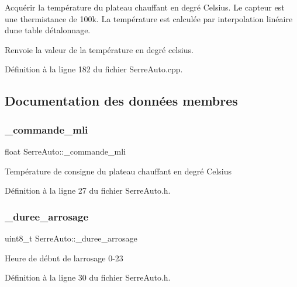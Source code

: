 Acquérir la température du plateau chauffant en degré Celsius. Le capteur est une thermistance de 100k. La température est calculée par interpolation linéaire d\textquotesingle{}une table d\textquotesingle{}étalonnage. 

\begin{DoxyReturn}{Renvoie}
la valeur de la température en degré celsius. 
\end{DoxyReturn}


Définition à la ligne 182 du fichier Serre\+Auto.\+cpp.



\subsection{Documentation des données membres}
\mbox{\label{class_serre_auto_aeb87d41d1df72cc4576a8a44d3726ed3}} 
\subsubsection{\+\_\+commande\+\_\+mli}
{\footnotesize\ttfamily float Serre\+Auto\+::\+\_\+commande\+\_\+mli\hspace{0.3cm}{\ttfamily [private]}}

Température de consigne du plateau chauffant en degré Celsius 

Définition à la ligne 27 du fichier Serre\+Auto.\+h.

\mbox{\label{class_serre_auto_a29f92bee6afa48e9e4a04b060f850655}} 
\subsubsection{\+\_\+duree\+\_\+arrosage}
{\footnotesize\ttfamily uint8\+\_\+t Serre\+Auto\+::\+\_\+duree\+\_\+arrosage\hspace{0.3cm}{\ttfamily [private]}}

Heure de début de l\textquotesingle{}arrosage 0-\/23 

Définition à la ligne 30 du fichier Serre\+Auto.\+h.

\mbox{\label{class_serre_auto_af0292eb1ae2713e715ca3813efc45775}} 
